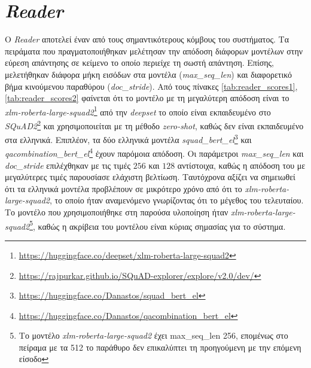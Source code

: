 \section{\emph{Reader}}
\label{sec:reader_exp}
Ο \emph{Reader} αποτελεί έναν από τους σημαντικότερους κόμβους του συστήματος. Τα πειράματα που πραγματοποιήθηκαν μελέτησαν την απόδοση διάφορων μοντέλων στην εύρεση απάντησης σε κείμενο το οποίο περιείχε τη σωστή απάντηση. Επίσης, μελετήθηκαν διάφορα μήκη εισόδων στα μοντέλα (\emph{max\_seq\_len}) και διαφορετικό βήμα κινούμενου παραθύρου (\emph{doc\_stride}). Από τους πίνακες \ref{tab:reader_scores1}, \ref{tab:reader_scores2} φαίνεται ότι το μοντέλο με τη μεγαλύτερη απόδοση είναι το \emph{xlm-roberta-large-squad2}\footnote{\url{https://huggingface.co/deepset/xlm-roberta-large-squad2}} από την \emph{deepset} το οποίο είναι εκπαιδευμένο στο \emph{SQuAD2}\footnote{\url{https://rajpurkar.github.io/SQuAD-explorer/explore/v2.0/dev/}} και χρησιμοποιείται με τη μέθοδο \emph{zero-shot}, καθώς δεν είναι εκπαιδευμένο στα ελληνικά. Επιπλέον, τα δύο ελληνικά μοντέλα \emph{squad\_bert\_el}\footnote{\url{https://huggingface.co/Danastos/squad_bert_el}} και \emph{qacombination\_bert\_el}\footnote{\url{https://huggingface.co/Danastos/qacombination_bert_el}} έχουν παρόμοια απόδοση. Οι παράμετροι \emph{max\_seq\_len} και \emph{doc\_stride} επιλέχθηκαν με τις τιμές $256$ και $128$ αντίστοιχα, καθώς η απόδοση του με μεγαλύτερες τιμές παρουσίασε ελάχιστη βελτίωση. Ταυτόχρονα αξίζει να σημειωθεί ότι τα ελληνικά μοντέλα προβλέπουν σε μικρότερο χρόνο από ότι το \emph{xlm-roberta-large-squad2}, το οποίο ήταν αναμενόμενο γνωρίζοντας ότι το μέγεθος του τελευταίου. Το μοντέλο που χρησιμοποιήθηκε στη παρούσα υλοποίηση ήταν \emph{xlm-roberta-large-squad2}\footnote{Το μοντέλο \emph{xlm-roberta-large-squad2} έχει max\_seq\_len 256, επομένως στο πείραμα με τα 512 το παράθυρο δεν επικαλύπτει τη προηγούμενη με την επόμενη είσοδο}, καθώς η ακρίβεια του μοντέλου είναι κύριας σημασίας για το σύστημα.



